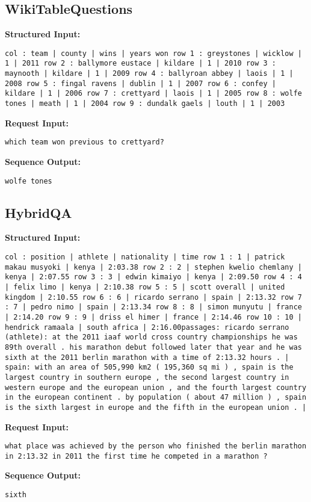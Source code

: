 \documentclass[11pt]{article}
\begin{document}
\subsection{WikiTableQuestions}
\textbf{Structured Input:} 
\begin{lstlisting}
col : team | county | wins | years won row 1 : greystones | wicklow | 1 | 2011 row 2 : ballymore eustace | kildare | 1 | 2010 row 3 : maynooth | kildare | 1 | 2009 row 4 : ballyroan abbey | laois | 1 | 2008 row 5 : fingal ravens | dublin | 1 | 2007 row 6 : confey | kildare | 1 | 2006 row 7 : crettyard | laois | 1 | 2005 row 8 : wolfe tones | meath | 1 | 2004 row 9 : dundalk gaels | louth | 1 | 2003
\end{lstlisting}
\textbf{Request Input:} 
\begin{lstlisting}
which team won previous to crettyard?
\end{lstlisting}
\textbf{Sequence Output:} 
\begin{lstlisting}
wolfe tones
\end{lstlisting}

\subsection{HybridQA}
\textbf{Structured Input:} 
\begin{lstlisting}
col : position | athlete | nationality | time row 1 : 1 | patrick makau musyoki | kenya | 2:03.38 row 2 : 2 | stephen kwelio chemlany | kenya | 2:07.55 row 3 : 3 | edwin kimaiyo | kenya | 2:09.50 row 4 : 4 | felix limo | kenya | 2:10.38 row 5 : 5 | scott overall | united kingdom | 2:10.55 row 6 : 6 | ricardo serrano | spain | 2:13.32 row 7 : 7 | pedro nimo | spain | 2:13.34 row 8 : 8 | simon munyutu | france | 2:14.20 row 9 : 9 | driss el himer | france | 2:14.46 row 10 : 10 | hendrick ramaala | south africa | 2:16.00passages: ricardo serrano (athlete): at the 2011 iaaf world cross country championships he was 89th overall . his marathon debut followed later that year and he was sixth at the 2011 berlin marathon with a time of 2:13.32 hours . | spain: with an area of 505,990 km2 ( 195,360 sq mi ) , spain is the largest country in southern europe , the second largest country in western europe and the european union , and the fourth largest country in the european continent . by population ( about 47 million ) , spain is the sixth largest in europe and the fifth in the european union . | 
\end{lstlisting}
\textbf{Request Input:} 
\begin{lstlisting}
what place was achieved by the person who finished the berlin marathon in 2:13.32 in 2011 the first time he competed in a marathon ?
\end{lstlisting}
\textbf{Sequence Output:} 
\begin{lstlisting}
sixth
\end{lstlisting}
\end{document}
